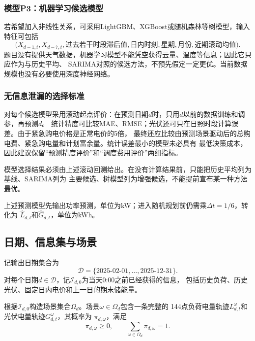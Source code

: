 \documentclass[UTF8,11pt]{ctexart}
\begin{document}
\subsubsection{模型P3：机器学习候选模型}

若希望加入非线性关系，可采用LightGBM、XGBoost或随机森林等树模型，输入特征可包括
\begin{equation}
 \bigl(X_{d-1,t},X_{d-7,t},\text{过去若干时段滞后值},
 \text{日内时刻},\text{星期},\text{月份},\text{近期滚动均值}\bigr).
\end{equation}
题目没有提供天气数据，机器学习模型不能凭空获得云量、温度等信息；因此它只应作为与历史平均、
SARIMA对照的候选方法，不预先假定一定更优。当前数据规模也没有必要使用深度神经网络。

\subsubsection{无信息泄漏的选择标准}

对每个候选模型采用滚动起点评价：在预测日期$d$时，只用$d$以前的数据训练和调参，再预测$d$。
统计精度可比较MAE、RMSE；光伏还可只在日照时段计算误差。由于紧急购电价格是正常电价的5倍，
最终还应比较由预测场景驱动后的总购电费、紧急购电量和计划富余量。统计误差最小的模型未必具有
最低决策成本，因此建议保留“预测精度评价”和“调度费用评价”两组指标。

模型选择结果必须由上述滚动回测给出。在没有计算结果前，只能把历史平均列为基线、SARIMA列为
主要候选、树模型列为增强候选，不能提前宣布某一种方法最优。

上述预测模型先输出功率预测，单位为kW；进入随机规划前仍需乘$\Delta t=1/6$，转化为
$\widehat L_{d,t}$和$\widehat G_{d,t}$，单位为kWh。

\subsection{日期、信息集与场景}

记输出日期集合为
\begin{equation}
    \mathcal{D}=\{\text{2025-02-01},\ldots,\text{2025-12-31}\}.
\end{equation}
对每个日期$d\in\mathcal{D}$，记$\mathcal{I}_{d,0}$为当天0:00之前已经获得的信息，
包括历史负荷、历史光伏、固定日内电价和上一日的期末储能量。

根据$\mathcal{I}_{d,0}$构造场景集合$\Omega_d$。场景$\omega\in\Omega_d$包含一条完整的
144点负荷电量轨迹$L^{\omega}_{d,t}$和光伏电量轨迹$G^{\omega}_{d,t}$，其概率为
$\pi_{d,\omega}$，满足
\begin{equation}
    \pi_{d,\omega}\geq0,
    \qquad
    \sum_{\omega\in\Omega_d}\pi_{d,\omega}=1.
\end{equation}
\end{document}
